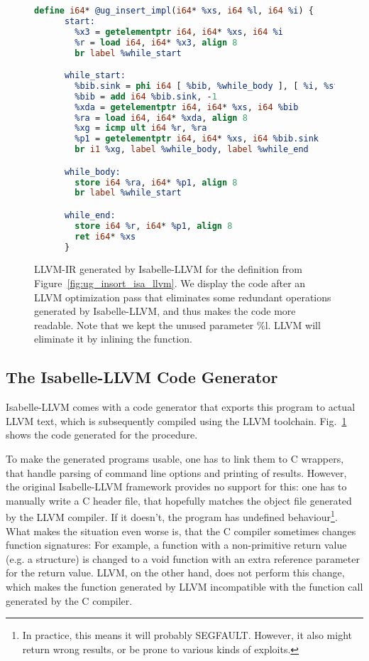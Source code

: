 \documentclass[sigplan,10pt,anonymous,review]{acmart}\settopmatter{printfolios=true,printccs=false,printacmref=false}
\theoremstyle{definition}
\begin{document}
  \begin{figure}
    \begin{lstlisting}[language=llvm,literate={}]
      define i64* @ug_insert_impl(i64* %xs, i64 %l, i64 %i) {
      start:
        %x3 = getelementptr i64, i64* %xs, i64 %i
        %r = load i64, i64* %x3, align 8
        br label %while_start

      while_start:
        %bib.sink = phi i64 [ %bib, %while_body ], [ %i, %start ]
        %bib = add i64 %bib.sink, -1
        %xda = getelementptr i64, i64* %xs, i64 %bib
        %ra = load i64, i64* %xda, align 8
        %xg = icmp ult i64 %r, %ra
        %p1 = getelementptr i64, i64* %xs, i64 %bib.sink
        br i1 %xg, label %while_body, label %while_end

      while_body:
        store i64 %ra, i64* %p1, align 8
        br label %while_start

      while_end:
        store i64 %r, i64* %p1, align 8
        ret i64* %xs
      }
    \end{lstlisting}
    \caption{LLVM-IR generated by Isabelle-LLVM for the definition from Figure~\ref{fig:ug_insort_isa_llvm}.
    We display the code after an LLVM optimization pass that eliminates some redundant operations generated by Isabelle-LLVM,
    and thus makes the code more readable. Note that we kept the unused parameter \%l. LLVM will eliminate it by inlining the function.
    }\label{fig:ug_insort_llvm}
  \end{figure}

  \subsection{The Isabelle-LLVM Code Generator}
  Isabelle-LLVM comes with a code generator that exports this program to actual LLVM text, which is subsequently compiled using the LLVM toolchain.
  Fig.~\ref{fig:ug_insort_llvm} shows the code generated for the  procedure.


  To make the generated programs usable, one has to link them to C wrappers, that handle parsing of command line options and printing of results.
  However, the original Isabelle-LLVM framework provides no support for this: one has to manually write a C header file, that hopefully matches the object file generated by the LLVM compiler. If it doesn't, the program has undefined behaviour\footnote{In practice, this means it will probably SEGFAULT. However, it also might return wrong results, or be prone to various kinds of exploits.}. What makes the situation even worse is, that the C compiler sometimes changes function signatures: For example, a function with a non-primitive return value (e.g. a structure) is changed to a void function with an extra
  reference parameter for the return value. LLVM, on the other hand, does not perform this change, which makes the function generated by LLVM incompatible with the function call generated by the C compiler.
\end{document}
